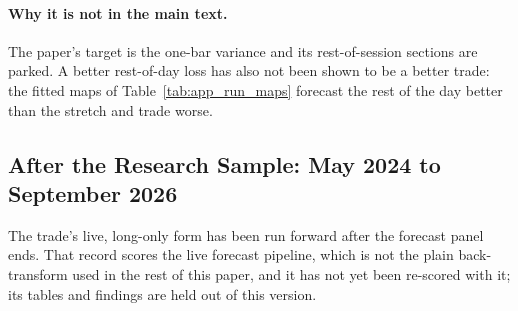 \paragraph{Why it is not in the main text.} The paper's target is the one-bar
variance and its rest-of-session sections are parked. A better rest-of-day
loss has also not been shown to be a better trade: the fitted maps of
Table~\ref{tab:app_run_maps} forecast the rest of the day better than the
stretch and trade worse.

\subsection{After the Research Sample: May 2024 to September 2026}
\label{sec:app_run_post2024}

The trade's live, long-only form has been run forward after the forecast panel
ends. That record scores the live forecast pipeline, which is not the plain
back-transform used in the rest of this paper, and it has not yet been
re-scored with it; its tables and findings are held out of this version.

